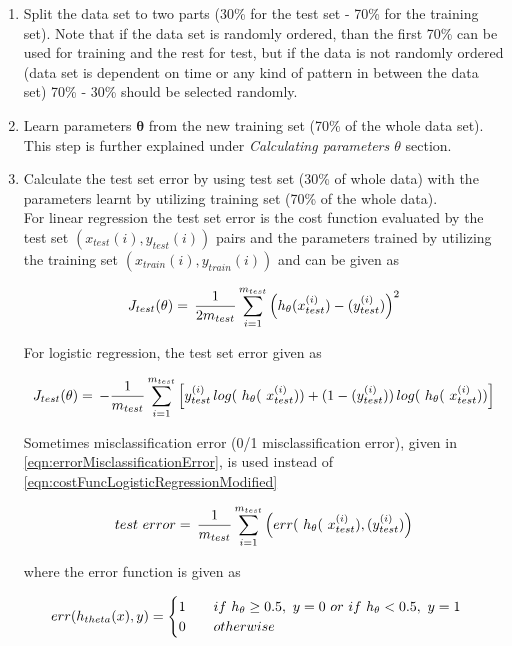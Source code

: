  \begin{enumerate}
 
  \item Split the data set to two parts (30\% for the test set - 70\% for the training set). 
  Note that if the data set is randomly ordered, than the first 70\% can be used for training and the rest for test, but if the data is not randomly ordered (data set is dependent on time or any kind of pattern in between the data set) 70\% - 30\% should be selected randomly.
  
  \item Learn parameters $\bm{\theta}$ from the new training set (70\% of the whole data set). This step is further explained under \emph{Calculating parameters $\theta$} section.

  \item Calculate the test set error by using test set (30\% of whole data) with the parameters learnt by utilizing training set (70\% of the whole data).\\
  For linear regression the test set error is the cost function evaluated by the test set $(x_{test}(i), y_{test}(i))$ pairs and the parameters trained by utilizing the training set $(x_{train}(i), y_{train}(i))$ and can be given as
	
	\begin{equation}{\label{eqn:costFuncTest}}
	J_{test}(\theta)
	=\,
	\frac{1}{2m_{test}} \sum\limits_{i=1}^{m_{test}} \Big(h_\theta(x_{test}^{(i)}) - (y_{test}^{(i)})\Big)^2  
	\end{equation} 
	
	For logistic regression, the test set error given as
	
	\begin{equation}{\label{eqn:costFuncLogisticRegressionModified}}
	J_{test}(\theta)
	=\,
	-\frac{1}{m_{test}} \sum\limits_{i=1}^{m_{test}} \Big[y_{test}^{(i)}\,log(\ h_\theta(\ x_{test}^{(i)})) + (1-(y_{test}^{(i)}))\,log(\ h_\theta(\ x_{test}^{(i)}))\Big]
	\end{equation} 
	
	Sometimes misclassification error (0/1 misclassification error), given in \ref{eqn:errorMisclassificationError}, is used instead of \ref{eqn:costFuncLogisticRegressionModified}
	
	\begin{equation}{\label{eqn:errorMisclassificationError}}
	 test\ error
	=\,
	\frac{1}{m_{test}} \sum\limits_{i=1}^{m_{test}} \Big(err(\ h_\theta(\ x_{test}^{(i)}), (y_{test}^{(i)})\Big)  
	\end{equation}
	
	where the error function is given as

	\begin{equation}{\label{eqn:misclassificationError}}
	  err(h_{theta}(x),y)=\begin{cases}
               1 \qquad if\ h_{\theta}\geq0.5,\ y=0 \ or\ if \ h_{\theta} < 0.5, \ y=1\\
               0 \qquad otherwise\\
            \end{cases}
	\end{equation} 

\end{enumerate}

